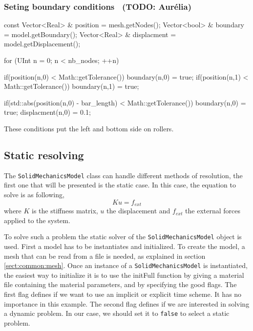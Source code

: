 \documentclass[a4paper,11pt]{book}
\newcommand{\code}[1]{\texttt{#1}}
\newcommand{\todo}[1]{~({\small\color{red}\textbf{TODO: }\textbf{#1}})}
\begin{document}
\subsubsection{Seting        boundary        conditions\label{sect:smm:boundary}
  \todo{Aur\'elia}}

\begin{cpp}
  const  Vector<Real> & position = mesh.getNodes();
  Vector<bool> & boundary = model.getBoundary();
  Vector<Real> & displacment = model.getDisplacement();

  for (UInt n = 0; n < nb_nodes; ++n) {
    if(position(n,0) < Math::getTolerance()) boundary(n,0) = true;
    if(position(n,1) < Math::getTolerance()) boundary(n,1) = true;

    if(std::abs(position(n,0) - bar_length) < Math::getTolerance()) {
      boundary(n,0) = true;
      displacment(n,0) = 0.1;
    }
  }
\end{cpp}

These conditions put the left and bottom side on rollers.


\subsection{Static resolving\label{sect:smm:static}}

The \code{SolidMechanicsModel} class can handle different methods of resolution,
the first  one that  will be  presented is the  static case.  In this  case, the
equation to solve is as following,
\begin{equation}\label{eqn:smm:static}
  K u = f_{ext}
\end{equation}
where $K$ is the stiffness matrix, $u$ the displacement and $f_{ext}$ the external
forces applied to the system.


To     solve    such     a    problem     the    static     solver     of    the
\code{SolidMechanicsModel}  object is used.   First a
model has to be instantiates and  initialized.  To create the model, a mesh that
can   be   read   from   a   file   is   needed,   as   explained   in   section
\ref{sect:common:mesh}.   Once an  instance of  a  \code{SolidMechanicsModel} is
instantiated,   the   easiest   way   to   initialize   it   is   to   use   the
initFull function by  giving a material file
containing the material parameters, and  by specifying the good flags. The first
flag defines if we  want to use an implicit or explicit  time scheme.  It has no
importance in  this example.  The second  flag defines if  we are  interested in
solving a  dynamic problem.  In  our case, we  should set it to  \code{false} to
select a static problem.
\end{document}
